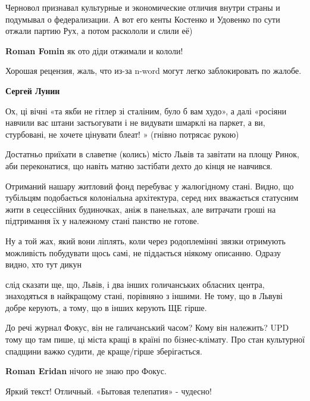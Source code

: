 \begin{itemize}
\begin{itemize}
Черновол признавал культурные и экономические отличия внутри страны и подумывал о федерализации.
А вот его кенты Костенко и Удовенко по сути отжали партию Рух, а потом раскололи и слили её)

\textbf{Roman Fomin} як ото діди отжимали и кололи!
\end{itemize} %

Хорошая рецензия, жаль, что из-за n-word могут легко заблокировать по жалобе.

\textbf{Сергей Лунин}


Ох, ці вічні «та якби не гітлер зі сталіним, було б вам худо», а далі «росіяни
навчили вас штани застьогувати і не видувати шмарклі на паркет, а ви,
стурбовані, не хочете цінувати блеат! » (гнівно потрясає рукою)

\begin{itemize} %

Достатньо приїхати в славетне (колись) місто Львів та завітати на площу Ринок,
аби переконатися, що навіть матню застібати дехто до кінця не навчився.

Отриманий нашару житловий фонд перебуває у жалюгідному стані. Видно, що
тубільцям подобається колоніальна архітектура, серед них вважається статусним
жити в сецессійних будиночках, аніж в панельках, але витрачати гроші на
підтримання їх у належному стані панство не готове.

Ну а той жах, який вони ліплять, коли через родоплемінні звязки отримують
можливість побудувати щось самі, не піддається ніякому описанню. Одразу видно,
хто тут дикун



слід сказати ще, що, Львів, і два інших голичанських обласних центра,
знаходяться в найкращому стані, порівняно з іншими. Не тому, що в Львуві добре
керують, а тому, що в інших керують ЩЕ гірше.


До речі журнал Фокус, він не галичанський часом? Кому він належить? UPD тому що
там пише, ці міста кращі в країні по бізнес-клімату. Про стан культурної
спадщини важко судити, де краще/гірше зберігається.

\textbf{Roman Eridan} нічого не знаю про Фокус.
\end{itemize} %

Яркий текст! Отличный. «Бытовая телепатия» - чудесно!


\end{itemize}
